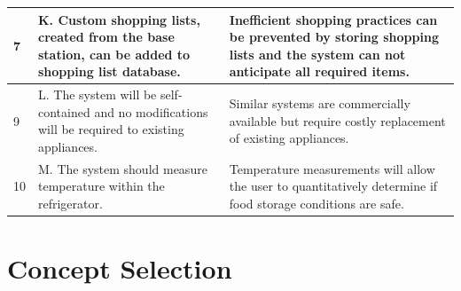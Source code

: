 \documentclass[11pt]{article} %
\begin{document}
\begin{table}[h!]
\begin{center}
\begin{tabular}{| p{1.2in} | p{2.5in} |p{2.5in} |}
\hline
7&K. Custom shopping lists, created from the base station, can be added to shopping list database.&Inefficient shopping practices can be prevented by storing shopping lists and the system can not anticipate all required items.\\
\hline
9&L. The system will be self-contained and no modifications will be required to existing appliances.&Similar systems are commercially available but require costly replacement of existing appliances.\\
\hline
10&M. The system should measure temperature within the refrigerator. & Temperature measurements will allow the user to quantitatively determine if food storage conditions are safe. \\
\hline
\end{tabular}
\end{center}
\end{table}
\pagebreak
\section{Concept Selection}
\end{document}
